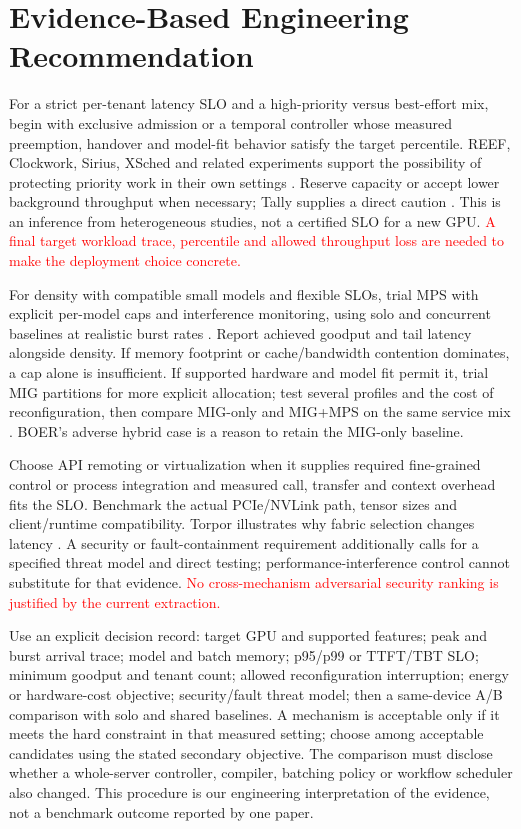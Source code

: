 \documentclass[12pt,a4paper]{article}
\newcommand{\red}[1]{\textcolor{red}{#1}}
\begin{document}

\section{Evidence-Based Engineering Recommendation}
For a strict per-tenant latency SLO and a high-priority versus best-effort mix, begin with exclusive admission or a temporal controller whose measured preemption, handover and model-fit behavior satisfy the target percentile. REEF, Clockwork, Sirius, XSched and related experiments support the possibility of protecting priority work in their own settings \cite{reef,clockwork,sirius,xsched}. Reserve capacity or accept lower background throughput when necessary; Tally supplies a direct caution \cite{tally}. This is an inference from heterogeneous studies, not a certified SLO for a new GPU. \red{A final target workload trace, percentile and allowed throughput loss are needed to make the deployment choice concrete.}

For density with compatible small models and flexible SLOs, trial MPS with explicit per-model caps and interference monitoring, using solo and concurrent baselines at realistic burst rates \cite{gpulet,gslice,vastpipe,deinfer}. Report achieved goodput and tail latency alongside density. If memory footprint or cache/bandwidth contention dominates, a cap alone is insufficient. If supported hardware and model fit permit it, trial MIG partitions for more explicit allocation; test several profiles and the cost of reconfiguration, then compare MIG-only and MIG+MPS on the same service mix \cite{gnntriton,dynap,boer}. BOER's adverse hybrid case is a reason to retain the MIG-only baseline.

Choose API remoting or virtualization when it supplies required fine-grained control or process integration and measured call, transfer and context overhead fits the SLO. Benchmark the actual PCIe/NVLink path, tensor sizes and client/runtime compatibility. Torpor illustrates why fabric selection changes latency \cite{torpor}. A security or fault-containment requirement additionally calls for a specified threat model and direct testing; performance-interference control cannot substitute for that evidence. \red{No cross-mechanism adversarial security ranking is justified by the current extraction.}

Use an explicit decision record: target GPU and supported features; peak and burst arrival trace; model and batch memory; p95/p99 or TTFT/TBT SLO; minimum goodput and tenant count; allowed reconfiguration interruption; energy or hardware-cost objective; security/fault threat model; then a same-device A/B comparison with solo and shared baselines. A mechanism is acceptable only if it meets the hard constraint in that measured setting; choose among acceptable candidates using the stated secondary objective. The comparison must disclose whether a whole-server controller, compiler, batching policy or workflow scheduler also changed. This procedure is our engineering interpretation of the evidence, not a benchmark outcome reported by one paper.
\end{document}
